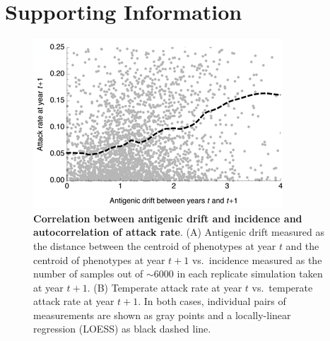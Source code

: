 \documentclass[11pt,oneside,letterpaper]{article}
\begin{document}
\pagebreak

\section*{Supporting Information}

\setcounter{figure}{0}
\setcounter{table}{0}
\setcounter{page}{1}
\renewcommand{\thefigure}{S\arabic{figure}}
\renewcommand{\thetable}{S\arabic{table}}
\renewcommand{\thepage}{S\arabic{page}}

\begin{figure}[H]
	\centering
	\includegraphics{figures/driftvsinc}
	\caption{\textbf{Correlation between antigenic drift and incidence and autocorrelation of attack rate}. (A) Antigenic drift measured as the distance between the centroid of phenotypes at year $t$ and the centroid of phenotypes at year $t+1$ vs.\ incidence measured as the number of samples out of $\sim6000$ in each replicate simulation taken at year $t+1$. (B) Temperate attack rate at year $t$ vs.\ temperate attack rate at year $t+1$. In both cases, individual pairs of measurements are shown as gray points and a locally-linear regression (LOESS) as black dashed line.}
	\label{driftvsinc}
\end{figure}
\end{document}
